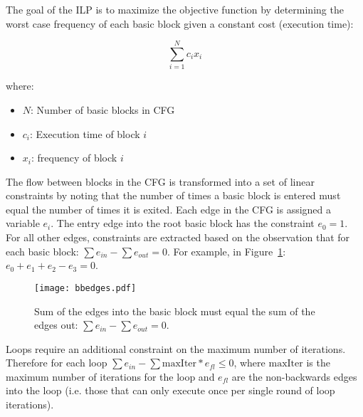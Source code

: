 	The goal of the ILP is to maximize the objective function by determining the worst case frequency of each basic block given a constant cost (execution time):

\begin{equation}
\sum_{i=1}^{N}c_ix_i 
\end{equation}

where:

\begin{itemize}
  \item $N$: Number of basic blocks in CFG
  \item $c_i$: Execution time of block $i$
  \item $x_i$: frequency of block $i$
\end{itemize}

	The flow between blocks in the CFG is transformed into a set of linear constraints by noting that the number of times a basic block is entered must equal the number of times it is exited. Each edge in the CFG is assigned a variable $e_i$. 
	The entry edge into the root basic block has the constraint $e_0 = 1$. 
	For all other edges, constraints are extracted based on the observation that for each basic block: $\sum e_{in} - \sum e_{out} = 0$. 
	For example, in Figure~\ref{f:bbedges}: $e_0+e_1+e_2-e_3=0$.

\begin{figure}[h]
\centering
\texttt{[image: bbedges.pdf]}
\caption[Sum of the edges into the basic block in IPET analysis]{Sum of the edges into the basic block must equal the sum of the edges out: $\sum e_{in} - \sum e_{out} = 0$.} 
\label{f:bbedges}
\end{figure}




Loops require an additional constraint on the maximum number of iterations. Therefore for each loop $\sum e_{in} - \sum \mathrm{maxIter}*e_{fl} \le 0$, where $\mathrm{maxIter}$ is the maximum number of iterations for the loop and $e_{fl}$ are the non-backwards edges into the loop (i.e. those that can only execute once per single round of loop iterations).


